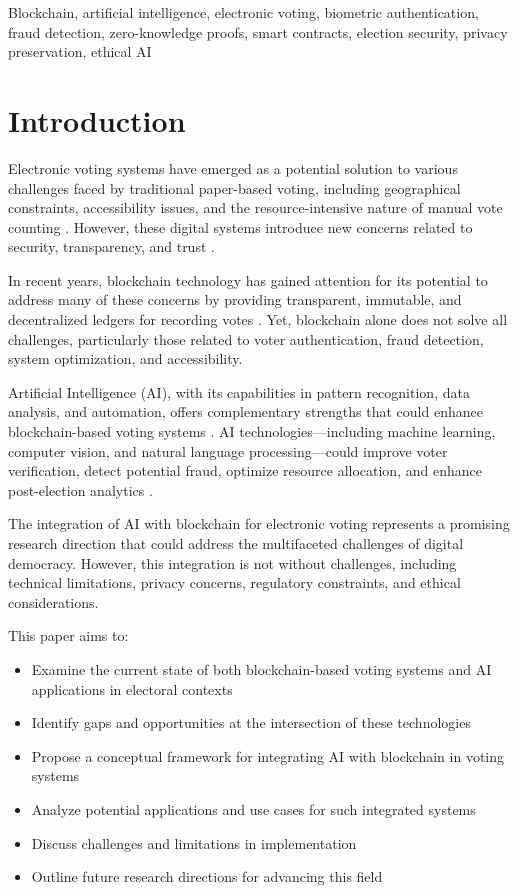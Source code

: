 \documentclass[conference]{IEEEtran}
\begin{document}
\begin{IEEEkeywords}
Blockchain, artificial intelligence, electronic voting, biometric authentication, fraud detection, zero-knowledge proofs, smart contracts, election security, privacy preservation, ethical AI
\end{IEEEkeywords}

\section{Introduction}
Electronic voting systems have emerged as a potential solution to various challenges faced by traditional paper-based voting, including geographical constraints, accessibility issues, and the resource-intensive nature of manual vote counting \cite{b1}. However, these digital systems introduce new concerns related to security, transparency, and trust \cite{b2}. 

In recent years, blockchain technology has gained attention for its potential to address many of these concerns by providing transparent, immutable, and decentralized ledgers for recording votes \cite{b2}. Yet, blockchain alone does not solve all challenges, particularly those related to voter authentication, fraud detection, system optimization, and accessibility. 

Artificial Intelligence (AI), with its capabilities in pattern recognition, data analysis, and automation, offers complementary strengths that could enhance blockchain-based voting systems \cite{b3}. AI technologies—including machine learning, computer vision, and natural language processing—could improve voter verification, detect potential fraud, optimize resource allocation, and enhance post-election analytics \cite{b3}.

The integration of AI with blockchain for electronic voting represents a promising research direction that could address the multifaceted challenges of digital democracy. However, this integration is not without challenges, including technical limitations, privacy concerns, regulatory constraints, and ethical considerations.

This paper aims to:
\begin{itemize}
    \item Examine the current state of both blockchain-based voting systems and AI applications in electoral contexts
    \item Identify gaps and opportunities at the intersection of these technologies
    \item Propose a conceptual framework for integrating AI with blockchain in voting systems
    \item Analyze potential applications and use cases for such integrated systems
    \item Discuss challenges and limitations in implementation
    \item Outline future research directions for advancing this field
\end{itemize}
\end{document}
